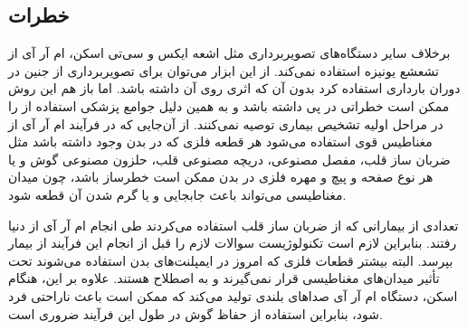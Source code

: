 \subsection{خطرات \mri}
برخلاف سایر دستگاه‌های تصویربرداری مثل اشعه ایکس و سی‌تی اسکن، ام آر آی از تشعشع یونیزه استفاده نمی‌کند. از این ابزار می‌توان برای تصویربرداری از جنین در دوران بارداری استفاده کرد بدون آن که اثری روی آن داشته باشد. اما باز هم این روش ممکن است خطراتی در پی داشته باشد و به همین دلیل جوامع پزشکی استفاده از \mri را در مراحل اولیه تشخیص بیماری توصیه نمی‌کنند. از آن‌جایی که در فرآیند ام آر آی از مغناطیس قوی استفاده می‌شود هر قطعه فلزی که در بدن وجود داشته باشد مثل ضربان ساز قلب، مفصل مصنوعی، دریچه مصنوعی قلب، حلزون مصنوعی گوش و یا هر نوع صفحه و پیچ و مهره فلزی در بدن ممکن است خطرساز باشد، چون میدان مغناطیسی می‌تواند باعث جابجایی و یا گرم شدن آن قطعه شود.

تعدادی از بیمارانی که از ضربان ساز قلب استفاده می‌کردند طی انجام ام آر آی از دنیا رفتند. بنابراین لازم است تکنولوژیست \mri سوالات لازم را قبل از انجام این فرآیند از بیمار بپرسد. البته بیشتر قطعات فلزی که امروز در ایمپلنت‌های بدن استفاده می‌شوند تحت تأثیر میدان‌های مغناطیسی قرار نمی‌گیرند و به اصطلاح
 هستند. علاوه بر این، هنگام اسکن، دستگاه ام آر آی صداهای بلندی تولید می‌کند که ممکن است باعث ناراحتی فرد شود، بنابراین استفاده از حفاظ گوش در طول این فرآیند ضروری است.




